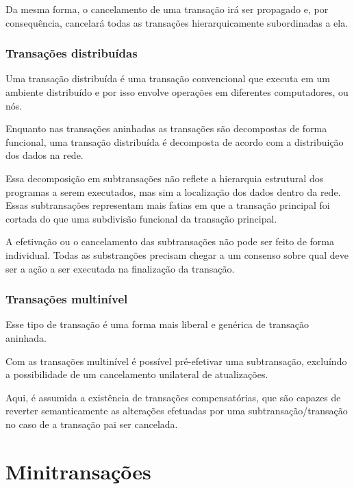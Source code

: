 \documentclass[11pt,twoside,a4paper]{book}
\begin{document}
Da mesma forma, o cancelamento de uma transação irá ser propagado e, por consequência, cancelará todas as transações hierarquicamente subordinadas a ela.

\subsubsection*{Transações distribuídas}
Uma transação distribuída é uma transação convencional que executa em um ambiente distribuído e por isso envolve operações em diferentes computadores, ou nós.

Enquanto nas transações aninhadas as transações são decompostas de forma funcional, uma transação distribuída é decomposta de acordo com a distribuição dos dados na rede.

Essa decomposição em subtransações não reflete a hierarquia estrutural dos programas a serem executados, mas sim a localização dos dados dentro da rede. Essas subtransações representam mais fatias em que a transação principal foi cortada do que uma subdivisão funcional da transação principal.

A efetivação ou o cancelamento das subtransações não pode ser feito de forma individual. Todas as substranções precisam chegar a um consenso sobre qual deve ser a ação a ser executada na finalização da transação.

\subsubsection*{Transações multinível}
Esse tipo de transação é uma forma mais liberal e genérica de transação aninhada.

Com as transações multinível é possível pré-efetivar uma subtransação, excluíndo a possibilidade de um cancelamento unilateral de atualizações.

Aqui, é assumida a existência de transações compensatórias, que são capazes de reverter semanticamente as alterações efetuadas por uma subtransação/transação no caso de a transação pai ser cancelada. 

\section{Minitransações}
\label{sec:minitransacao}
\end{document}
